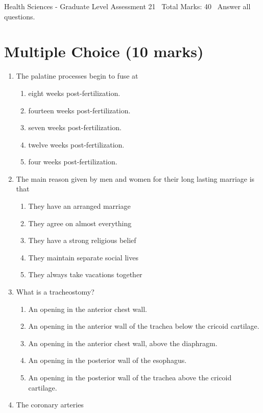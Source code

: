\documentclass[12pt]{article}
\begin{document}
\begin{center}
Health Sciences - Graduate Level Assessment 21 \
Total Marks: 40 \
Answer all questions.
\end{center}

\section*{Multiple Choice (10 marks)}
\begin{enumerate}[label=\arabic*.]
\item The palatine processes begin to fuse at
\begin{enumerate}[label=(\alph*)]
    \item eight weeks post-fertilization.
    \item fourteen weeks post-fertilization.
    \item seven weeks post-fertilization.
    \item twelve weeks post-fertilization.
    \item four weeks post-fertilization.
\end{enumerate}
\item The main reason given by men and women for their long lasting marriage is that
\begin{enumerate}[label=(\alph*)]
    \item They have an arranged marriage
    \item They agree on almost everything
    \item They have a strong religious belief
    \item They maintain separate social lives
    \item They always take vacations together
\end{enumerate}
\item What is a tracheostomy?
\begin{enumerate}[label=(\alph*)]
    \item An opening in the anterior chest wall.
    \item An opening in the anterior wall of the trachea below the cricoid cartilage.
    \item An opening in the anterior chest wall, above the diaphragm.
    \item An opening in the posterior wall of the esophagus.
    \item An opening in the posterior wall of the trachea above the cricoid cartilage.
\end{enumerate}
\item The coronary arteries

\end{enumerate}
\end{document}
